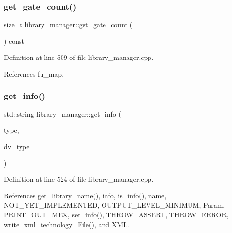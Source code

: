 \subsubsection{\texorpdfstring{get\+\_\+gate\+\_\+count()}{get\_gate\_count()}}
{\footnotesize\ttfamily \hyperlink{tutorial__fpt__2017_2intro_2sixth_2test_8c_a7c94ea6f8948649f8d181ae55911eeaf}{size\+\_\+t} library\+\_\+manager\+::get\+\_\+gate\+\_\+count (\begin{DoxyParamCaption}{ }\end{DoxyParamCaption}) const}



Definition at line 509 of file library\+\_\+manager.\+cpp.



References fu\+\_\+map.

\mbox{\label{classlibrary__manager_a61e98740a159d328dc986c4729844162}} 
\subsubsection{\texorpdfstring{get\+\_\+info()}{get\_info()}}
{\footnotesize\ttfamily std\+::string library\+\_\+manager\+::get\+\_\+info (\begin{DoxyParamCaption}\item[{const \hyperlink{classlibrary__manager_a5914a62c60d05c22f2547de9d8ef20de}{info\+\_\+t}}]{type,  }\item[{const \hyperlink{target__device_8hpp_a476becc690220f0805ce73006449c732}{Target\+Device\+\_\+\+Type}}]{dv\+\_\+type }\end{DoxyParamCaption})}



Definition at line 524 of file library\+\_\+manager.\+cpp.



References get\+\_\+library\+\_\+name(), info, is\+\_\+info(), name, N\+O\+T\+\_\+\+Y\+E\+T\+\_\+\+I\+M\+P\+L\+E\+M\+E\+N\+T\+ED, O\+U\+T\+P\+U\+T\+\_\+\+L\+E\+V\+E\+L\+\_\+\+M\+I\+N\+I\+M\+UM, Param, P\+R\+I\+N\+T\+\_\+\+O\+U\+T\+\_\+\+M\+EX, set\+\_\+info(), T\+H\+R\+O\+W\+\_\+\+A\+S\+S\+E\+RT, T\+H\+R\+O\+W\+\_\+\+E\+R\+R\+OR, write\+\_\+xml\+\_\+technology\+\_\+\+File(), and X\+ML.

